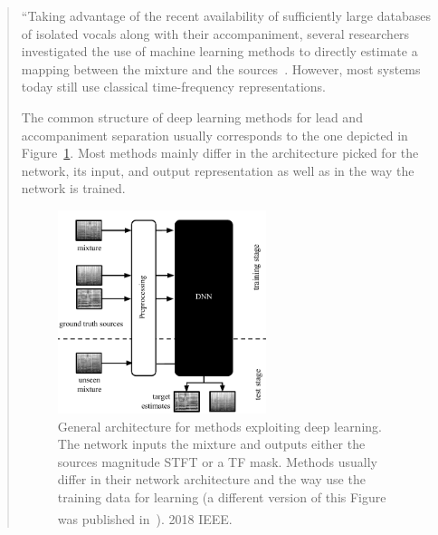 \begin{quote}
  ``Taking advantage of the recent availability of sufficiently large databases of isolated vocals along with their accompaniment, several researchers investigated the use of machine learning methods to directly estimate a mapping between the mixture and the sources~\cite{huang14, uhlich15}.
  However, most systems today still use classical time-frequency representations.

  The common structure of deep learning methods for lead and accompaniment separation usually corresponds to the one depicted in Figure~\ref{fig:methods_dnn}.
  Most methods mainly differ in the architecture picked for the network, its input, and output representation as well as in the way the network is trained.

  \begin{figure}
    \centering
    \includegraphics[width=0.6\textwidth]{Chapters/06_Separation_Unknown/figures/methods_dnn.pdf}
    \caption{General architecture for methods exploiting deep learning. The network inputs the mixture and outputs either the sources magnitude \acs{STFT} or a TF mask. Methods usually differ in their network architecture and the way use the training data for learning (a different version of this Figure was published in~\cite{rafii}). \textsuperscript{\textregistered}2018 IEEE.}
    \label{fig:methods_dnn}
  \end{figure}


\end{quote}
